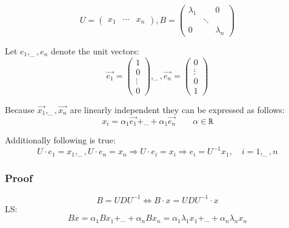 \begin{equation*}
U=\begin{pmatrix}x_{1}	&	\cdots	&x_{n}\end{pmatrix},B=\begin{pmatrix}
	\lambda_{1}	&			&	0 \\
				&	\ddots	&	 \\
	0			&			&	\lambda_{n}
	\end{pmatrix}
\end{equation*}

Let $e_{1},_{\cdots},e_{n}$ denote the unit vectors:
\begin{equation*}
\overrightarrow{e_{1}}=\begin{pmatrix}1\\0\\ \vdots\\0\end{pmatrix},_{\cdots},
\overrightarrow{e_{n}}=\begin{pmatrix}0\\ \vdots\\0\\1\end{pmatrix}
\end{equation*}

Because $\overrightarrow{x_{1}},_{\cdots},\overrightarrow{x_{n}}$ are linearly independent they can be expressed as follows:
\begin{equation*}
x_{i}=\alpha_{1}\overrightarrow{e_{1}}+_{\cdots}+\alpha_{1}\overrightarrow{e_{n}}\qquad\alpha\in\texttt{R}
\end{equation*}

Additionally following is true:
\begin{equation}\label{eq:eq3}
U\cdot e_{1} = x_{1},_{\cdots},U\cdot e_{n}=x_{n}\Rightarrow U\cdot e_{i}=x_{i}\Rightarrow e_{i}=U^{-1}x_{1},\quad i=1,_{\cdots},n
\end{equation}

\subsubsection{Proof}
\begin{equation*}
B=UDU^{-1}\Leftrightarrow B\cdot x=UDU^{-1}\cdot x
\end{equation*}
LS:
\begin{equation}\label{eq:p2ls}
Bx=\alpha_{1}Bx_{1}+_{\cdots}+\alpha_{n}Bx_{n}=\alpha_{1}\lambda_{1}x_{1}+_{\cdots}+\alpha_{n}\lambda_{n}x_{n}
\end{equation}

